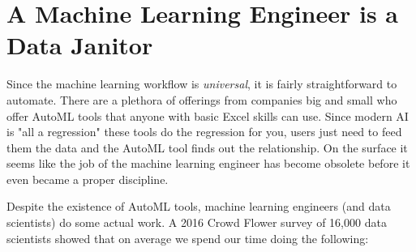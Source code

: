 \section{A Machine Learning Engineer is a Data Janitor}

Since the machine learning workflow is \textit{universal}, it is fairly straightforward to automate. There are a plethora of offerings from companies big and small who offer AutoML tools that anyone with basic Excel skills can use. Since modern AI is "all a regression" these tools do the regression for you, users just need to feed them the data and the AutoML tool finds out the relationship. On the surface it seems like the job of the machine learning engineer has become obsolete before it even became a proper discipline. 

Despite the existence of AutoML tools, machine learning engineers (and data scientists) do some actual work. A 2016 Crowd Flower survey of 16,000 data scientists showed that on average we spend our time doing the following:

